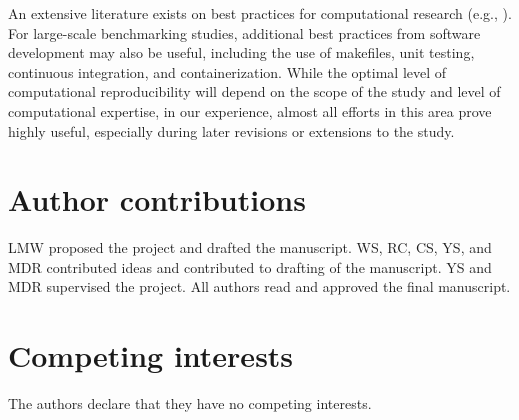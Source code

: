 \documentclass[12pt, a4paper]{article}
\begin{document}
An extensive literature exists on best practices for computational research (e.g., \citep{Sandve2013}). For large-scale benchmarking studies, additional best practices from software development may also be useful, including the use of makefiles, unit testing, continuous integration, and containerization. While the optimal level of computational reproducibility will depend on the scope of the study and level of computational expertise, in our experience, almost all efforts in this area prove highly useful, especially during later revisions or extensions to the study.




\newpage

\section*{Author contributions}

LMW proposed the project and drafted the manuscript. WS, RC, CS, YS, and MDR contributed ideas and contributed to drafting of the manuscript. YS and MDR supervised the project. All authors read and approved the final manuscript.




\section*{Competing interests}

The authors declare that they have no competing interests.





\newpage


\singlespacing
\footnotesize




\end{document}
